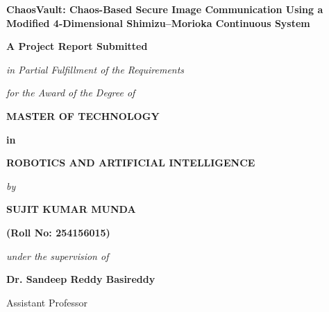\documentclass[12pt,a4paper,oneside]{report}
\begin{document}

\begin{titlepage}
    \thispagestyle{empty}
    \begin{center}
        \vspace*{0.5cm}
        {\LARGE \bfseries ChaosVault: Chaos-Based Secure Image Communication Using a Modified 4-Dimensional Shimizu--Morioka Continuous System \par}
        
        \vspace{1.2cm}
        {\large \textbf{A Project Report Submitted} \par}
        \vspace{0.2cm}
        {\large \textit{in Partial Fulfillment of the Requirements} \par}
        \vspace{0.2cm}
        {\large \textit{for the Award of the Degree of} \par}
        \vspace{0.4cm}
        {\Large \textbf{MASTER OF TECHNOLOGY} \par}
        \vspace{0.2cm}
        {\large \textbf{in} \par}
        \vspace{0.2cm}
        {\Large \textbf{ROBOTICS AND ARTIFICIAL INTELLIGENCE} \par}
        
        \vspace{0.8cm}
        {\large \textit{by} \par}
        \vspace{0.2cm}
        {\Large \textbf{SUJIT KUMAR MUNDA} \par}
        {\large \textbf{(Roll No: 254156015)} \par}
        
        \vspace{0.8cm}
        {\large \textit{under the supervision of} \par}
        \vspace{0.2cm}
        {\Large \textbf{Dr. Sandeep Reddy Basireddy} \par}
        {\large Assistant Professor \par}
        

\end{center}
\end{titlepage}
\end{document}
